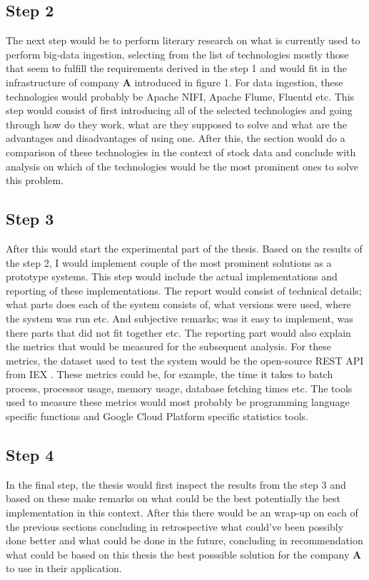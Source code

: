 \documentclass[article,11pt]{article}
\begin{document}
\subsection*{Step 2}

The next step would be to perform literary research on what is currently used to perform big-data ingestion, selecting from the list of technologies mostly those that seem to fulfill the requirements derived in the step 1 and would fit in the infrastructure of company \textbf{A} introduced in figure 1.
For data ingestion, these technologies would probably be Apache NIFI, Apache Flume, Fluentd etc.
This step would consist of first introducing all of the selected technologies and going through how do they work, what are they supposed to solve and what are the advantages and disadvantages of using one.
After this, the section would do a comparison of these technologies in the context of stock data and conclude with analysis on which of the technologies would be the most prominent ones to solve this problem.

\subsection*{Step 3}

After this would start the experimental part of the thesis.
Based on the results of the step 2, I would implement couple of the most prominent solutions as a prototype systems.
This step would include the actual implementations and reporting of these implementations.
The report would consist of technical details; what parts does each of the system consists of, what versions were used, where the system was run etc. And subjective remarks; was it easy to implement, was there parts that did not fit together etc. The reporting part would also explain the metrics that would be measured for the subsequent analysis.
For these metrics, the dataset used to test the system would be the open-source REST API from IEX \cite{iex}.
These metrics could be, for example, the time it takes to batch process, processor usage, memory usage, database fetching times etc. The tools used to measure these metrics would most probably be programming language specific functions and Google Cloud Platform specific statistics tools. 

\subsection*{Step 4}

In the final step, the thesis would first inspect the results from the step 3 and based on these make remarks on what could be the best potentially the best implementation in this context.
After this there would be an wrap-up on each of the previous sections concluding in retrospective what could've been possibly done better and what could be done in the future, concluding in recommendation what could be based on this thesis the best posssible solution for the company \textbf{A} to use in their application. 


\printbibliography
\end{document}
